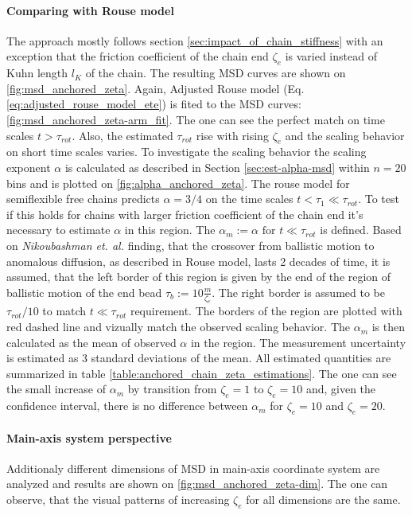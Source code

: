 \documentclass[
    paper=A4,pagesize=automedia,fontsize=12pt,
    BCOR=15mm,DIV=22,
    twoside,headinclude,footinclude=false,
    fleqn,             %
    bibliography=totocnumbered,          %
    listof=totoc,                %
    listof=flat,                 %
    cleardoublepage=empty      %
    numbers=endperiod
]{scrartcl}
\begin{document}
\paragraph{Comparing with Rouse model}
The approach mostly follows section \ref{sec:impact_of_chain_stiffness} with an exception that
the friction coefficient of the chain end $\zeta_e$ is varied instead of Kuhn length $l_K$ 
of the chain. The resulting MSD curves are shown on 
\autoref{fig:msd_anchored_zeta}. Again, Adjusted Rouse model 
(Eq. \ref{eq:adjusted_rouse_model_ete}) is fited to
the MSD curves: \autoref{fig:msd_anchored_zeta-arm_fit}. The one can see
the perfect match on time scales $t > \tau_{rot}$. Also, the estimated $\tau_{rot}$
rise with rising $\zeta_e$ and the scaling behavior on short time scales 
varies. To investigate the scaling behavior the scaling exponent $\alpha$ is
calculated as described in Section \ref{sec:est-alpha-msd} 
within $n=20$ bins and is plotted on \autoref{fig:alpha_anchored_zeta}.
The rouse model for semiflexible free chains predicts $\alpha=3/4$ on the
time scales $t < \tau_{1} \ll \tau_{rot}$. To test if this holds for chains with larger
friction coefficient of the chain end it's necessary to estimate $\alpha$ in this
region. The $\alpha_m := \alpha \text{ for } t \ll \tau_{rot}$ is defined.
Based on \emph{Nikoubashman et. al.} \cite{Nikoubashman2016} finding,
that the crossover from ballistic motion to anomalous diffusion, as described 
in Rouse model, lasts 2 decades of time, it is assumed, 
that the left border of this region is given by the end of the region of ballistic
motion of the end bead $\tau_b  := 10 \frac{m}{\zeta_e}$. The right border is
assumed to be $\tau_{rot} / 10$ to match $t \ll \tau_{rot}$ requirement.
The borders of the region are plotted with red dashed line and vizually match
the observed scaling behavior. The $\alpha_m$ is then calculated as the mean
of observed $\alpha$ in the region. The measurement uncertainty is estimated
as 3 standard deviations of the mean. All estimated quantities are summarized
in table \ref{table:anchored_chain_zeta_estimations}. The one can see the 
small increase of $\alpha_m$ by transition from $\zeta_e=1$ to $\zeta_e=10$ and, 
given the confidence interval, there is no difference between 
$\alpha_m$ for $\zeta_e = 10$ and $\zeta_e=20$.

\paragraph{Main-axis system perspective}
Additionaly different dimensions of MSD in main-axis coordinate system are
analyzed and results are shown on \autoref{fig:msd_anchored_zeta-dim}.
The one can observe, that the visual patterns of 
increasing $\zeta_e$ for all dimensions are the same.
\end{document}
